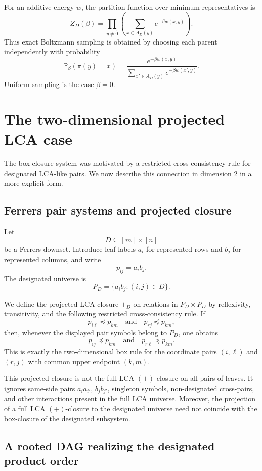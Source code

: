 \documentclass[11pt]{article}
\begin{document}
For an additive energy $w$, the partition function over minimum representatives is
\[
Z_D(\beta)
=
\prod_{y\ne\hat{0}}
\left(
\sum_{x\in A_D(y)}e^{-\beta w(x,y)}
\right).
\]
Thus exact Boltzmann sampling is obtained by choosing each parent independently with probability
\[
\mathbb P_\beta(\pi(y)=x)
=
\frac{e^{-\beta w(x,y)}}{\sum_{x'\in A_D(y)}e^{-\beta w(x',y)}}.
\]
Uniform sampling is the case $\beta=0$.

\section{The two-dimensional projected LCA case}

The box-closure system was motivated by a restricted cross-consistency rule for designated LCA-like pairs. We now describe this connection in dimension $2$ in a more explicit form.

\subsection{Ferrers pair systems and projected closure}

Let
\[
D\subseteq [m]\times[n]
\]
be a Ferrers downset. Introduce leaf labels $a_i$ for represented rows and $b_j$ for represented columns, and write
\[
p_{ij}=a_i b_j.
\]
The designated universe is
\[
P_D=\{a_i b_j:(i,j)\in D\}.
\]

We define the projected LCA closure $+_D$ on relations in $P_D\times P_D$ by reflexivity, transitivity, and the following restricted cross-consistency rule. If
\[
p_{i\ell}\preceq p_{km}
\quad\text{and}\quad
p_{rj}\preceq p_{km},
\]
then, whenever the displayed pair symbols belong to $P_D$, one obtains
\[
p_{ij}\preceq p_{km}
\quad\text{and}\quad
p_{r\ell}\preceq p_{km}.
\]
This is exactly the two-dimensional box rule for the coordinate pairs $(i,\ell)$ and $(r,j)$ with common upper endpoint $(k,m)$.

This projected closure is not the full LCA $(+)$-closure on all pairs of leaves. It ignores same-side pairs $a_i a_{i'}$, $b_j b_{j'}$, singleton symbols, non-designated cross-pairs, and other interactions present in the full LCA universe. Moreover, the projection of a full LCA $(+)$-closure to the designated universe need not coincide with the box-closure of the designated subsystem.

\subsection{A rooted DAG realizing the designated product order}
\end{document}
